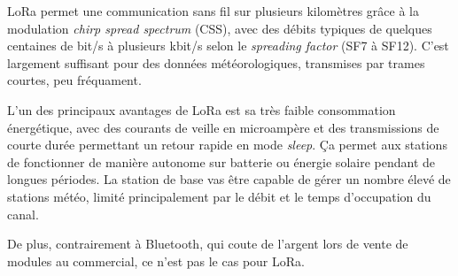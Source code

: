 LoRa permet une communication sans fil sur plusieurs kilomètres grâce à la modulation 
\textit{chirp spread spectrum} (CSS), avec des débits typiques de quelques centaines de bit/s à plusieurs kbit/s selon le 
\textit{spreading factor} (SF7 à SF12). C'est largement suffisant pour des données météorologiques, transmises par trames courtes, peu
fréquament. 

L'un des principaux avantages de LoRa est sa très faible consommation énergétique, avec des courants de veille en microampère et des 
transmissions de courte durée permettant un retour rapide en mode \textit{sleep}. Ça permet aux stations de fonctionner de manière 
autonome sur batterie ou énergie solaire pendant de longues périodes. La station de base vas être capable de gérer un nombre 
élevé de stations météo, limité principalement par le débit et le temps d'occupation du canal.

De plus, contrairement à Bluetooth, qui coute de l'argent lors de vente de modules au commercial, ce n'est pas le cas pour LoRa.